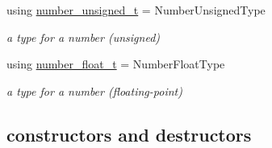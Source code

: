 \begin{DoxyCompactItemize}
$$using \mbox{\hyperlink{classnlohmann_1_1basic__json_ab906e29b5d83ac162e823ada2156b989}{number\+\_\+unsigned\+\_\+t}} = Number\+Unsigned\+Type
\begin{DoxyCompactList}\small\item\em a type for a number (unsigned) \end{DoxyCompactList}\item 
using \mbox{\hyperlink{classnlohmann_1_1basic__json_a88d6103cb3620410b35200ee8e313d97}{number\+\_\+float\+\_\+t}} = Number\+Float\+Type
\begin{DoxyCompactList}\small\item\em a type for a number (floating-\/point) \end{DoxyCompactList}\end{DoxyCompactItemize}
\subsection*{constructors and destructors}
\label{_amgrpd94b4d3d0135946bb7bdf25e48755337}%
